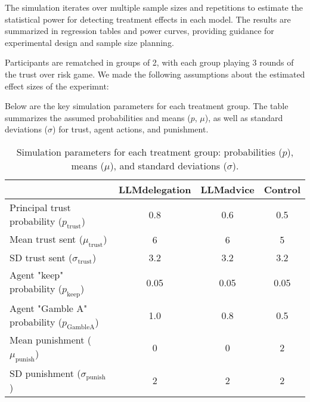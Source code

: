 \documentclass[
]{article}
\begin{document}
The simulation iterates over multiple sample sizes and repetitions to
estimate the statistical power for detecting treatment effects in each
model. The results are summarized in regression tables and power curves,
providing guidance for experimental design and sample size planning.

Participants are rematched in groups of 2, with each group playing 3
rounds of the trust over risk game. We made the following assumptions
about the estimated effect sizes of the experimnt:

Below are the key simulation parameters for each treatment group. The
table summarizes the assumed probabilities and means (\(p\), \(\mu\)),
as well as standard deviations (\(\sigma\)) for trust, agent actions,
and punishment.

\begin{table}[ht]
\centering
\begin{tabular}{lccc}
\toprule
 & \textbf{LLMdelegation} & \textbf{LLMadvice} & \textbf{Control} \\
\midrule
Principal trust probability ($p_\text{trust}$) & 0.8 & 0.6 & 0.5 \\
Mean trust sent ($\mu_\text{trust}$) & 6 & 6 & 5 \\
SD trust sent ($\sigma_\text{trust}$) & 3.2 & 3.2 & 3.2 \\
Agent "keep" probability ($p_\text{keep}$) & 0.05 & 0.05 & 0.05 \\
Agent "Gamble A" probability ($p_\text{GambleA}$) & 1.0 & 0.8 & 0.5 \\
Mean punishment ($\mu_\text{punish}$) & 0 & 0 & 2 \\
SD punishment ($\sigma_\text{punish}$) & 2 & 2 & 2 \\
\bottomrule
\end{tabular}
\caption{Simulation parameters for each treatment group: probabilities ($p$), means ($\mu$), and standard deviations ($\sigma$).}
\end{table}
\end{document}
